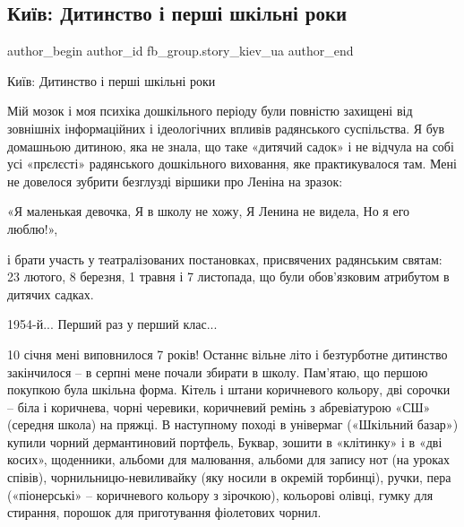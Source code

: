  
 
 
 
 
 
\subsection{Київ: Дитинство і перші шкільні роки}
\label{sec:19_12_2021.fb.fb_group.story_kiev_ua.1.detstvo_shkola}
 
\ifcmt
 author_begin
   author_id fb_group.story_kiev_ua
 author_end
\fi

Київ: Дитинство і перші шкільні роки 

Мій мозок і моя психіка дошкільного періоду були повністю захищені від
зовнішніх інформаційних і ідеологічних впливів радянського суспільства. Я був
домашньою дитиною, яка не знала, що таке «дитячий садок» і не відчула на собі
усі «прєлєсті» радянського дошкільного виховання, яке практикувалося там. Мені
не довелося зубрити безглузді віршики про Леніна на зразок:

\obeycr
«Я маленькая девочка,
Я в школу не хожу,
Я Ленина не видела,
Но я его люблю!»,
\restorecr

і брати участь у театралізованих постановках, присвячених радянським святам: 23
лютого, 8 березня, 1 травня і 7 листопада, що були обов’язковим атрибутом в
дитячих садках.

1954-й... Перший раз у перший клас...

10 січня мені виповнилося 7 років! Останнє вільне літо і безтурботне дитинство
закінчилося – в серпні мене почали збирати в школу. Пам’ятаю, що першою
покупкою була шкільна форма. Кітель і штани коричневого кольору, дві сорочки –
біла і коричнева, чорні черевики, коричневий ремінь з абревіатурою «СШ»
(середня школа) на пряжці. В наступному поході в універмаг («Шкільний базар»)
купили чорний дермантиновий портфель, Буквар, зошити в «клітинку» і в «дві
косих», щоденники, альбоми для малювання, альбоми для запису нот (на уроках
співів), чорнильницю-невиливайку (яку носили в окремій торбинці), ручки, пера
(«піонерські» – коричневого кольору з зірочкою), кольорові олівці, гумку для
стирання, порошок для приготування фіолетових чорнил.

